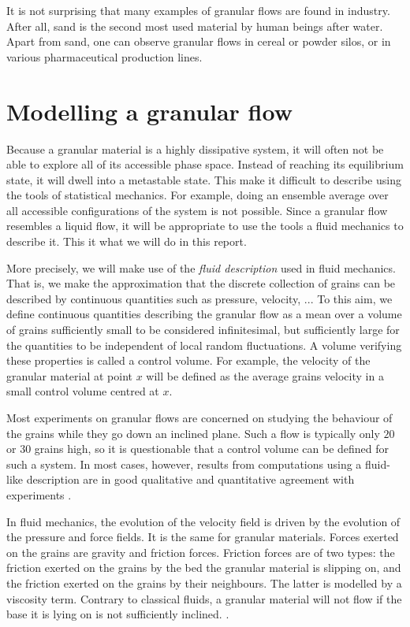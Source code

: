 It is not surprising that many examples of granular flows are found in industry. After all, sand is the second most used material by human beings after water. 
Apart from sand, one can observe granular flows in cereal or powder silos, or in various pharmaceutical production lines.

\section{Modelling a granular flow}

Because a granular material is a highly dissipative system, it will often not be able to explore all of its accessible phase space. Instead of reaching its equilibrium state, it will dwell into a metastable state.
This make it difficult to describe using the tools of statistical mechanics. For example, doing an ensemble average over all accessible configurations of the system is not possible.
Since a granular flow resembles a liquid flow, it will be appropriate to use the tools a fluid mechanics to describe it. This it what we will do in this report.

More precisely, we will make use of the \textit{fluid description} used in fluid mechanics. That is, we make the approximation that the discrete collection of grains can be described by continuous quantities such as pressure, velocity, ... 
To this aim, we define continuous quantities describing the granular flow as a mean over a volume of grains sufficiently small to be considered infinitesimal, but sufficiently large for the quantities to be independent of local random fluctuations. 
A volume verifying these properties is called a control volume. 
For example, the velocity of the granular material at point $x$ will be defined as the average grains velocity in a small control volume centred at $x$.

Most experiments on granular flows are concerned on studying the behaviour of the grains while they go down an inclined plane. 
Such a flow is typically only $20$ or $30$ grains high, so it is questionable that a control volume can be defined for such a system. In most cases,  however, results from computations using a fluid-like description are in good qualitative and quantitative agreement with experiments \cite{midi}.

In fluid mechanics, the evolution of the velocity field is driven by the evolution of the pressure and force fields. It is the same for granular materials. Forces exerted on the grains are gravity and friction forces. Friction forces are of two types: the friction exerted on the grains by the bed the granular material is slipping on, and the friction exerted on the grains by their neighbours. The latter is modelled by a viscosity term.
Contrary to classical fluids, a granular material will not flow if the base it is lying on is not sufficiently inclined. \cite{pouli2}. 

